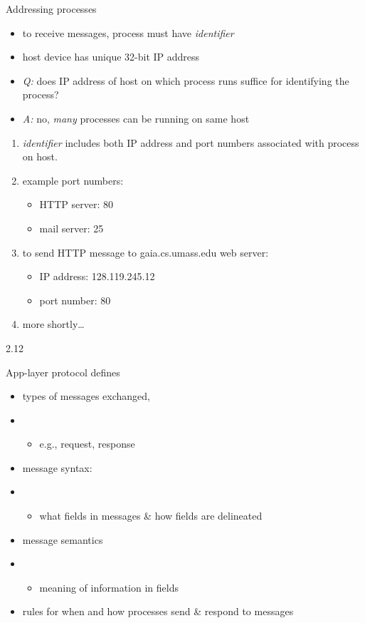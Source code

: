 \documentclass[
]{article}
\begin{document}
Addressing processes

\begin{itemize}
\item
  to receive messages, process must have \emph{identifier}
\item
  host device has unique 32-bit IP address
\item
  \emph{Q:} does IP address of host on which process runs suffice for
  identifying the process?
\item
  \emph{A:} no, \emph{many} processes can be running on same host
\end{itemize}

\begin{enumerate}
\def\labelenumi{\arabic{enumi}.}
\item
  \emph{identifier} includes both IP address and port numbers associated
  with process on host.
\item
  example port numbers:

  \begin{itemize}
  \item
    HTTP server: 80
  \item
    mail server: 25
  \end{itemize}
\item
  to send HTTP message to gaia.cs.umass.edu web server:

  \begin{itemize}
  \item
    IP address: 128.119.245.12
  \item
    port number: 80
  \end{itemize}
\item
  more shortly\ldots{}
\end{enumerate}

2.12

App-layer protocol defines

\begin{itemize}
\item
  types of messages exchanged,
\item
  \begin{itemize}
  \item
    e.g., request, response
  \end{itemize}
\item
  message syntax:
\item
  \begin{itemize}
  \item
    what fields in messages \& how fields are delineated
  \end{itemize}
\item
  message semantics
\item
  \begin{itemize}
  \item
    meaning of information in fields
  \end{itemize}
\item
  rules for when and how processes send \& respond to messages
\end{itemize}
\end{document}
